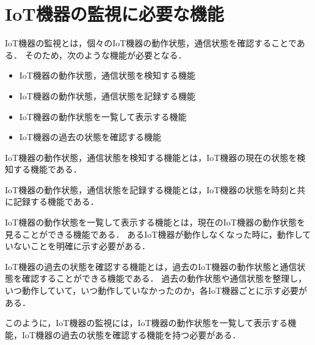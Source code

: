 \section{IoT機器の監視に必要な機能}%
IoT機器の監視とは，個々のIoT機器の動作状態，通信状態を確認することである．
そのため，次のような機能が必要となる．
\begin{itemize}
	\item IoT機器の動作状態，通信状態を検知する機能
	\item IoT機器の動作状態，通信状態を記録する機能
	\item IoT機器の動作状態を一覧して表示する機能
	\item IoT機器の過去の状態を確認する機能
\end{itemize}

IoT機器の動作状態，通信状態を検知する機能とは，IoT機器の現在の状態を検知する機能である．

IoT機器の動作状態，通信状態を記録する機能とは，IoT機器の状態を時刻と共に記録する機能である．

IoT機器の動作状態を一覧して表示する機能とは，現在のIoT機器の動作状態を見ることができる機能である．
あるIoT機器が動作しなくなった時に，動作していないことを明確に示す必要がある．
\medskip

IoT機器の過去の状態を確認する機能とは，過去のIoT機器の動作状態と通信状態を確認することができる機能である．
過去の動作状態や通信状態を整理し，いつ動作していて，いつ動作していなかったのか，各IoT機器ごとに示す必要がある．
\medskip

このように，IoT機器の監視には，IoT機器の動作状態を一覧して表示する機能，IoT機器の過去の状態を確認する機能を持つ必要がある．












